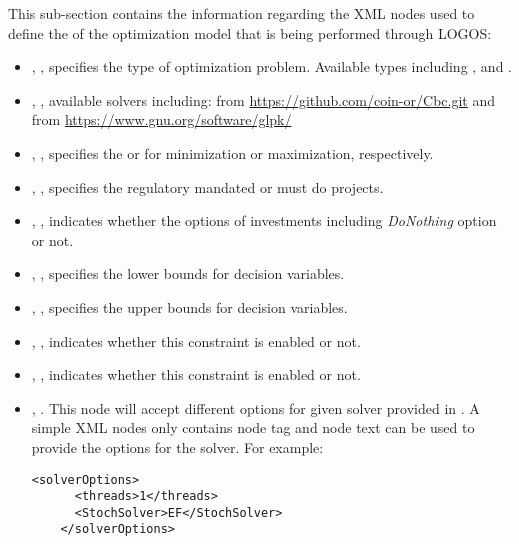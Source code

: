 This sub-section contains the information regarding the XML nodes used to define the
 of the optimization model that is being performed through LOGOS:
\begin{itemize}
  \item {}, , specifies the type of
  optimization problem. Available types including ,
   and .
  \item {}, , available solvers including:
   from \url{https://github.com/coin-or/Cbc.git} and  from
  \url{https://www.gnu.org/software/glpk/}
  \item {}, , specifies the 
  or  for minimization or maximization, respectively.
  \item {}, ,
  specifies the regulatory mandated or must do projects.
  \item {}, , indicates whether the
  options of investments including \textit{DoNothing} option or not.
  \item {}, , specifies the lower bounds
  for decision variables.
  \item {}, , specifies the upper bounds
  for decision variables.
  \item {}, , indicates whether
  this constraint is enabled or not.
  \item {}, , indicates whether
  this constraint is enabled or not.
  \item {}, . This node will accept
  different options for given solver provided in . A simple XML nodes only contains
  node tag and node text can be used to provide the options for the solver. For example:
  \begin{lstlisting}[style=XML]
    <solverOptions>
      <threads>1</threads>
      <StochSolver>EF</StochSolver>
    </solverOptions>
  \end{lstlisting}
\end{itemize}

